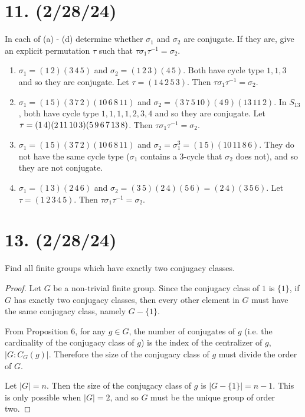 \documentclass{article}
\begin{document}
\section*{11. (2/28/24)}

In each of (a) - (d) determine whether $\sigma_1$ and $\sigma_2$ are conjugate. If they are, give an explicit permutation $\tau$ such that $\tau \sigma_1 \tau^{-1} = \sigma_2$.

\begin{enumerate}[label=(\alph*), itemsep=0em]
    \item $\sigma_1 = (1\, 2)(3\, 4\, 5)$ and $\sigma_2 = (1\, 2\, 3)(4\, 5)$. Both have cycle type $1,1,3$ and so they are conjugate. Let $\tau = (1\, 4\, 2\, 5\, 3)$. Then $\tau \sigma_1 \tau^{-1} = \sigma_2$.
    \item $\sigma_1 = (1\, 5)(3\, 7\, 2)(10\, 6\, 8\, 11)$ and $\sigma_2 = (3\, 7\, 5\, 10)(4\, 9)(13\, 11\, 2)$. In $S_13$, both have cycle type $1,1,1,1,2,3,4$ and so they are conjugate. Let $\tau = \\ (1\, 4)(2\, 11\, 10\, 3)(5\, 9\, 6\, 7\, 13\, 8)$. Then $\tau \sigma_1 \tau^{-1} = \sigma_2$.
    \item $\sigma_1 = (1\, 5)(3\, 7\, 2)(10\, 6\, 8\, 11)$ and $\sigma_2 = \sigma_1^3 = (1\, 5)(10\, 11\, 8\, 6)$. They do not have the same cycle type ($\sigma_1$ contains a 3-cycle that $\sigma_2$ does not), and so they are not conjugate.
    \item $\sigma_1 = (1\, 3)(2\, 4\, 6)$ and $\sigma_2 = (3\, 5)(2\, 4)(5\, 6) = (2\, 4)(3\, 5\, 6)$. Let $\tau = (1\, 2\, 3\, 4\, 5)$. Then $\tau \sigma_1 \tau^{-1} = \sigma_2$.
\end{enumerate}

\section*{13. (2/28/24)}

Find all finite groups which have exactly two conjugacy classes.

\begin{proof}
    Let $G$ be a non-trivial finite group. Since the conjugacy class of $1$ is $\{ 1 \}$, if $G$ has exactly two conjugacy classes, then every other element in $G$ must have the same conjugacy class, namely $G - \{ 1 \}$.

    From Proposition 6, for any $g \in G$, the number of conjugates of $g$ (i.e. the cardinality of the conjugacy class of $g$) is the index of the centralizer of $g$, $|G:C_G(g)|$. Therefore the size of the conjugacy class of $g$ must divide the order of $G$.

    Let $|G| = n$. Then the size of the conjugacy class of $g$ is $|G - \{ 1 \}| = n - 1$. This is only possible when $|G| = 2$, and so $G$ must be the unique group of order two.
\end{proof}
\end{document}
